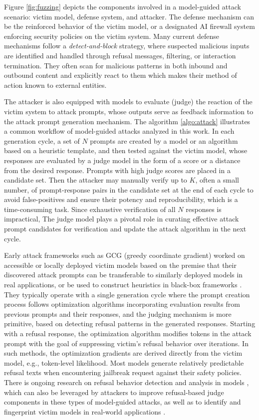 \documentclass[conference,compsoc]{IEEEtran}
\begin{document}
Figure \ref{fig:fuzzing} depicts the components involved in a model-guided attack scenario: victim model, defense system, and attacker.
 The defense mechanism can be the reinforced behavior of the victim model, or a designated AI firewall system enforcing security policies on the victim system.
 Many current defense mechanisms follow a \textit{detect-and-block} strategy, where suspected malicious inputs are identified and handled through refusal messages, filtering, or interaction termination.
 They often scan for malicious patterns in both inbound and outbound content and explicitly react to them which makes their method of action known to external entities.

The attacker is also equipped with models to evaluate (judge) the reaction of the victim system to attack prompts, whose outputs serve as feedback information to the attack prompt generation mechanism.
 The algorithm \ref{algo:attack} illustrates a common workflow of model-guided attacks analyzed in this work.
 In each generation cycle, a set of $N$ prompts are created by a model or an algorithm based on a heuristic template, and then tested against the victim model, whose responses are evaluated by a judge model in the form of a score or a distance from the desired response.
 Prompts with high judge scores are placed in a candidate set.
 Then the attacker may manually verify up to $K$, often a small number, of prompt-response pairs in the candidate set  at the end of each cycle to avoid false-positives and ensure their potency and reproducibility, which is a time-consuming task.
 Since exhaustive verification of all $N$ responses is impractical, The judge model plays a pivotal role in curating effective attack prompt candidates for verification and update the attack algorithm in the next cycle.

Early attack frameworks such as GCG (greedy coordinate gradient) \cite{gcg2023} worked on accessible or locally deployed victim models based on the premise that their discovered attack prompts can be transferable to similarly deployed models in real applications, or be used to construct heuristics in black-box frameworks \cite{chaos2024}.
 They typically operate with a single generation cycle where the prompt creation process follows optimization algorithms incorporating evaluation results from previous prompts and their responses, and the judging mechanism is more primitive, based on detecting refusal patterns in the generated responses.
 Starting with a refusal response, the optimization algorithm modifies tokens in the attack prompt with the goal of suppressing victim's refusal behavior over iterations.
 In such methods, the optimization gradients are derived directly from the victim model, e.g., token-level likelihood.
 Most models generate relatively predictable refusal texts when encountering jailbreak request against their safety policies.
 There is ongoing research on refusal behavior detection and analysis in models \cite{xie2024sorrybench, extractcls2025}, which can also be leveraged by attackers to improve refusal-based judge components in these types of model-guided attacks, as well as to identify and fingerprint victim models in real-world applications \cite{pasquini2025llmmap}.
\end{document}
